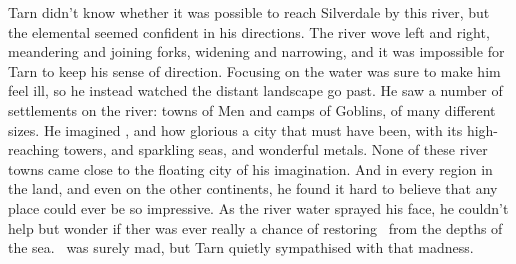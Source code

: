 Tarn didn't know whether it was possible to reach Silverdale by this river, but the elemental seemed confident in his directions.  The river wove left and right, meandering and joining forks, widening and narrowing, and it was impossible for Tarn to keep his sense of direction. Focusing on the water was sure to make him feel ill, so he instead watched the distant landscape go past.  He saw a number of settlements on the river: towns of Men and camps of Goblins, of many different sizes.  He imagined \valdunmir, and how glorious a city that must have been, with its high-reaching towers, and sparkling seas, and wonderful metals.  None of these river towns came close to the floating city of his imagination.  And in every region in the land, and even on the other continents, he found it hard to believe that any place could ever be so impressive.  As the river water sprayed his face, he couldn't help but wonder if ther was ever really a chance of restoring \valdunmir\ from the depths of the sea.  \mothzam\ was surely mad, but Tarn quietly sympathised  with that madness.





















